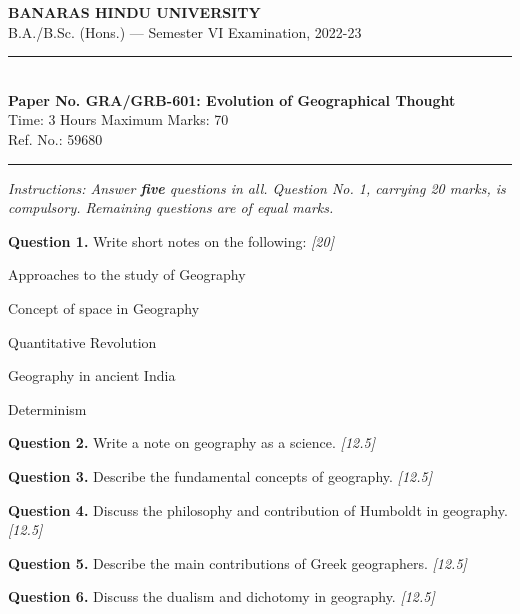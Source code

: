 \documentclass[11pt,a4paper]{article}
\newcommand{\pts}[1]{\hfill   \textit{[#1]}}
\begin{document}
\begin{center}
  {\large\bfseries BANARAS HINDU UNIVERSITY}\\[2pt]
  {\normalsize B.A./B.Sc. (Hons.) --- Semester VI Examination, 2022-23}\\[6pt]
  \rule{0.8\linewidth}{0.5pt}\\[6pt]
  {\large\bfseries Paper No. GRA/GRB-601: Evolution of Geographical Thought}\\[4pt]
  {\normalsize Time: 3 Hours \hfill Maximum Marks: 70}\\[2pt]
  {\small Ref. No.: 59680}
\end{center}
\rule{\linewidth}{0.4pt}
\smallskip



\noindent   \textit{Instructions: Answer   \textbf{five} questions in all. Question No. 1, carrying 20 marks, is compulsory. Remaining questions are of equal marks.}
\bigskip




\noindent   \textbf{Question 1.} Write short notes on the following: \pts{20}

\begin{parts}
  \item Approaches to the study of Geography
  \item Concept of space in Geography
  \item Quantitative Revolution
  \item Geography in ancient India
  \item Determinism
\end{parts}

\medskip


\noindent   \textbf{Question 2.} Write a note on geography as a science. \pts{12.5}

\medskip


\noindent   \textbf{Question 3.} Describe the fundamental concepts of geography. \pts{12.5}

\medskip


\noindent   \textbf{Question 4.} Discuss the philosophy and contribution of Humboldt in geography. \pts{12.5}

\medskip


\noindent   \textbf{Question 5.} Describe the main contributions of Greek geographers. \pts{12.5}

\medskip


\noindent   \textbf{Question 6.} Discuss the dualism and dichotomy in geography. \pts{12.5}

\medskip
\end{document}

